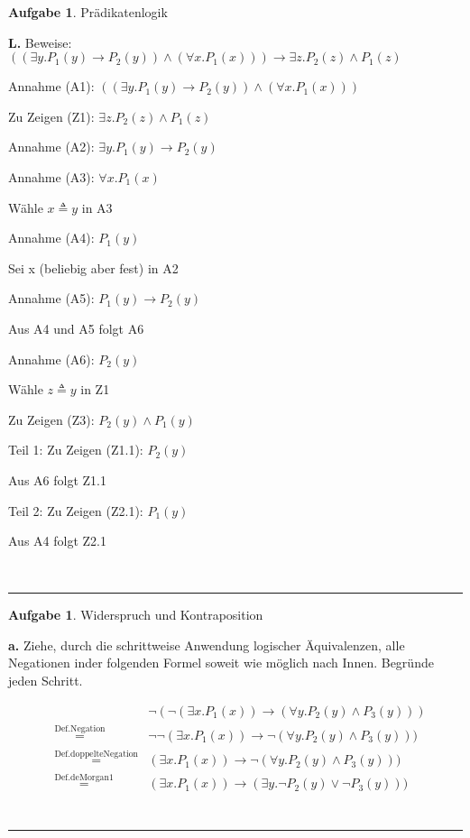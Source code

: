 \documentclass[10pt,leqno ]{article}
\newcommand\customeq[1]{\overset{\mathrm{#1}}{=}}
\theoremstyle{definition}
\newtheorem{problem}[theorem]{Aufgabe}
\newenvironment{solution}[1][L]{\begin{doublespace}\textbf{#1.}\quad }{\ \rule{0.5em}{0.5em}\end{doublespace}}
\begin{document}
\begin{problem}
    Prädikatenlogik
\end{problem}

\begin{solution}
Beweise: \( ((\exists y . P_1(y) \rightarrow P_2(y)) \land (\forall x . P_1(x))) \rightarrow \exists z . P_2(z) \land P_1(z) \)

Annahme (A1): \( ((\exists y . P_1(y) \rightarrow P_2(y)) \land (\forall x . P_1(x))) \)

Zu Zeigen (Z1): \( \exists z . P_2(z) \land P_1(z) \)

Annahme (A2): \( \exists y . P_1(y) \rightarrow P_2(y) \)

Annahme (A3): \( \forall x . P_1(x) \)

Wähle \(  x \triangleq y \) in A3

Annahme (A4): \( P_1(y) \)

Sei x (beliebig aber fest) in A2

Annahme (A5): \( P_1(y) \rightarrow P_2(y) \)

Aus A4 und A5 folgt A6

Annahme (A6): \( P_2(y) \)

Wähle \( z \triangleq y \) in Z1

Zu Zeigen (Z3): \( P_2(y) \land P_1(y) \)

Teil 1: Zu Zeigen (Z1.1): \( P_2(y) \)

\qquad Aus A6 folgt Z1.1

Teil 2: Zu Zeigen (Z2.1): \( P_1(y) \)

\qquad Aus A4 folgt Z2.1

\end{solution}

\begin{problem}
    Widerspruch und Kontraposition
\end{problem}

\begin{solution}[a]
    Ziehe, durch die schrittweise Anwendung logischer Äquivalenzen, alle Negationen inder folgenden Formel soweit wie möglich nach Innen. Begründe jeden Schritt.

    \begin{equation*}
        \begin{aligned}
        && \lnot(\lnot(\exists x . P_1(x)) \rightarrow (\forall y . P_2(y) \land P_3(y))) \\
        & \customeq{Def. Negation} & \lnot \lnot(\exists x . P_1(x)) \rightarrow \lnot(\forall y . P_2(y) \land P_3(y))) \\
        & \customeq{Def. doppelte Negation} & (\exists x . P_1(x)) \rightarrow \lnot(\forall y . P_2(y) \land P_3(y))) \\
        & \customeq{Def. de Morgan 1} & (\exists x . P_1(x)) \rightarrow (\exists y . \lnot P_2(y) \lor \lnot P_3(y))) \\
        \end{aligned}
    \end{equation*}
\end{solution}
\end{document}
